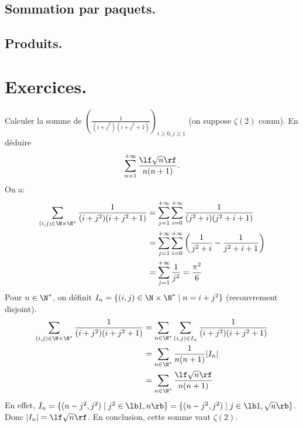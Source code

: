 \documentclass[11pt]{article}
\begin{document}
\subsection{Sommation par paquets.}

\subsection{Produits.}

\pagebreak

\section{Exercices.}

\begin{exercice}{}{}
    Calculer la somme de \Large$\left( \frac{1}{(i+j^2)(i+j^2+1)} \right)_{i\geq 0,j\geq1}$ \normalsize (on suppose $\zeta(2)$ connu). En déduire
    \begin{equation*}
        \sum_{n=1}^{+\infty}\frac{\lf \sqrt{n} \rf}{n(n+1)}.
    \end{equation*}
    \tcblower
    On a:
    \begin{align*}
        \sum_{(i,j)\in\N\times\N^*}\frac{1}{(i+j^2)(i+j^2+1)}&=\sum_{j=1}^{+\infty}\sum_{i=0}^{+\infty}\frac{1}{(j^2+i)(j^2+i+1)}\\
        &=\sum_{j=1}^{+\infty}\sum_{i=0}^{+\infty}\left( \frac{1}{j^2+i}-\frac{1}{j^2+i+1} \right)\\
        &=\sum_{j=1}^{+\infty}\frac{1}{j^2}=\frac{\pi^2}{6}
    \end{align*}
    Pour $n\in\N^*$, on définit $I_n=\{(i,j)\in\N\times\N^*\mid n=i+j^2\}$ (recouvrement disjoint).
    \begin{align*}
        \sum_{(i,j)\in\N\times\N^*}\frac{1}{(i+j^2)(i+j^2+1)}&=\sum_{n\in\N^*}\sum_{(i,j)\in I_n}\frac{1}{(i+j^2)(i+j^2+1)}\\
        &=\sum_{n\in\N^*}\frac{1}{n(n+1)}|I_n|\\
        &=\sum_{n\in\N^*}\frac{\lf \sqrt{n} \rf}{n(n+1)}
    \end{align*}
    En effet, $I_n=\{(n-j^2,j^2)\mid j^2\in\lb1,n\rb\}=\{(n-j^2,j^2)\mid j\in\lb1,\sqrt{n}\rb\}$. Donc $|I_n|=\lf\sqrt{n}\rf$.\n
    En conclusion, cette somme vaut $\zeta(2)$.
\end{exercice}
\end{document}
